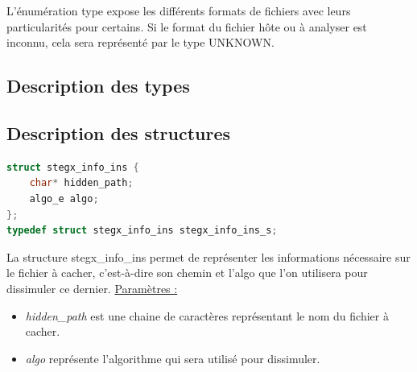 \documentclass[11pt]{article}
\begin{document}
L'énumération type expose les différents formats de fichiers avec leurs 
particularités pour certains. Si le format du fichier hôte ou à analyser 
est inconnu, cela sera représenté par le type UNKNOWN. \newline

\subsection{Description des types}

\subsection{Description des structures}



\begin{lstlisting}[language=c]
struct stegx_info_ins {
    char* hidden_path;
    algo_e algo;
};
typedef struct stegx_info_ins stegx_info_ins_s;
\end{lstlisting}

La structure stegx\_info\_ins permet de représenter les informations 
nécessaire sur le fichier à cacher, c'est-à-dire son chemin et l'algo que 
l'on utilisera pour dissimuler ce dernier. \newline
\underline{Paramètres :}
\begin{itemize}
\item \textit{hidden\_path} est une chaine de caractères représentant le nom du fichier 
à cacher. 
\item \textit{algo} représente l'algorithme qui sera utilisé pour dissimuler. 
\newline
\end{itemize}
\end{document}
